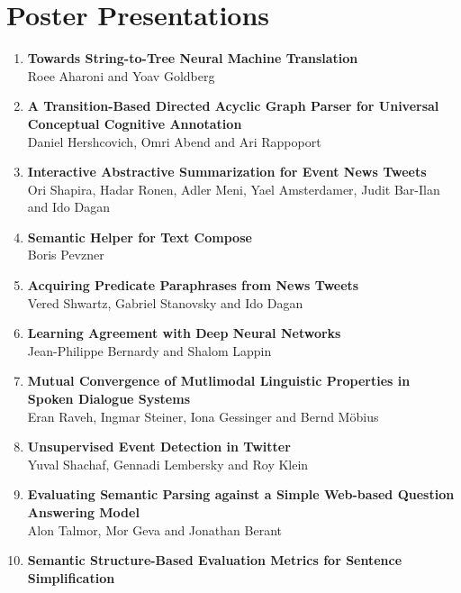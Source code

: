 \documentclass[a0,portrait]{a0poster}
\begin{document}
    \pagebreak

    \section*{Poster Presentations}

    {\LARGE
    \begin{enumerate}
        \item
        \textbf{Towards String-to-Tree Neural Machine Translation}\\
        Roee Aharoni and Yoav Goldberg
        \item
        \textbf{A Transition-Based Directed Acyclic Graph Parser for Universal
        Conceptual Cognitive Annotation}\\
        Daniel Hershcovich, Omri Abend and Ari Rappoport
        \item
        \textbf{Interactive Abstractive Summarization for Event News Tweets}\\
        Ori Shapira, Hadar Ronen, Adler Meni, Yael Amsterdamer, Judit Bar-Ilan
        and Ido Dagan
        \item
        \textbf{Semantic Helper for Text Compose}\\
        Boris Pevzner
        \item
        \textbf{Acquiring Predicate Paraphrases from News Tweets}\\
        Vered Shwartz, Gabriel Stanovsky and Ido Dagan
        \item
        \textbf{Learning Agreement with Deep Neural Networks}\\
        Jean-Philippe Bernardy and Shalom Lappin
        \item
        \textbf{Mutual Convergence of Mutlimodal Linguistic Properties in
        Spoken Dialogue Systems}\\
        Eran Raveh, Ingmar Steiner, Iona Gessinger and Bernd M\"obius
        \item
        \textbf{Unsupervised Event Detection in Twitter}\\
        Yuval Shachaf, Gennadi Lembersky and Roy Klein
        \item
        \textbf{Evaluating Semantic Parsing against a Simple Web-based
        Question Answering Model}\\
        Alon Talmor, Mor Geva and Jonathan Berant
        \item
        \textbf{Semantic Structure-Based Evaluation Metrics for Sentence
        Simplification}\\

\end{enumerate}}
\end{document}

